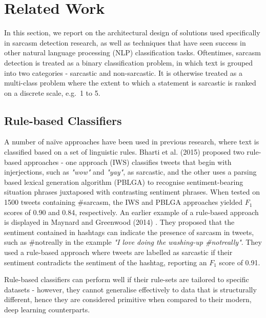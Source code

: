 \documentclass[12pt,a4paper]{article}
\begin{document}
\section{Related Work}
\vspace{-4.2pt}
\noindent In this section, we report on the architectural design of solutions used specifically in sarcasm detection research, as well as techniques that have seen success in other natural language processing (NLP) classification tasks. Oftentimes, sarcasm detection is treated as a binary classification problem, in which text is grouped into two categories - sarcastic and non-sarcastic. It is otherwise treated as a multi-class problem where the extent to which a statement is sarcastic is ranked on a discrete scale, e.g.\ 1 to 5.\vspace{-5pt}

\subsection{Rule-based Classifiers}\vspace{-10pt}
\noindent A number of na\"{i}ve approaches have been used in previous research, where text is classified based on a set of linguistic rules. Bharti et al. (2015) \cite{bharti2015parsing} proposed two rule-based approaches - one approach (IWS) classifies tweets that begin with injerjections, such as \textit{"wow"} and \textit{"yay"}, as sarcastic, and the other uses a parsing based lexical generation algorithm (PBLGA) to recognise sentiment-bearing situation phrases juxtaposed with contrasting sentiment phrases. When tested on 1500 tweets containing \#sarcasm, the IWS and PBLGA approaches yielded $F_1$ scores of 0.90 and 0.84, respectively. An earlier example of a rule-based approach is displayed in Maynard and Greenwood (2014) \cite{maynard2014cares}. They proposed that the sentiment contained in hashtags can indicate the presence of sarcasm in tweets, such as \#notreally in the example \textit{"I love doing the washing-up \#notreally"}. They used a rule-based approach where tweets are labelled as sarcastic if their sentiment contradicts the sentiment of the hashtag, reporting an $F_{1}$ score of 0.91. 

Rule-based classifiers can perform well if their rule-sets are tailored to specific datasets - however, they cannot generalise effectively to data that is structurally different, hence they are considered  primitive when compared to their modern, deep learning counterparts.
\end{document}

